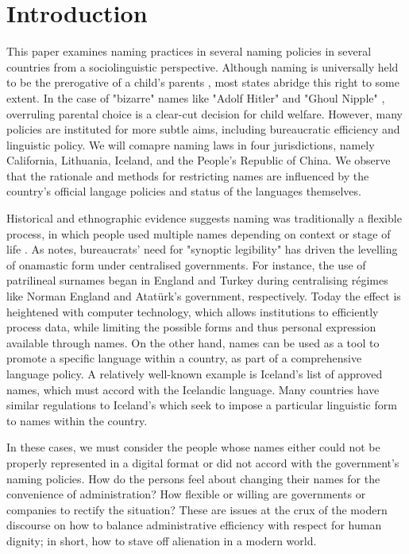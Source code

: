 \section{Introduction}

This paper examines naming practices in several naming policies in several
countries from a sociolinguistic perspective. Although naming is universally
held to be the prerogative of a child's parents \parencite{alford88}, most
states abridge this right to some extent. In the case of "bizarre" names like
"Adolf Hitler" and "Ghoul Nipple" \parencite{larson09}, overruling parental
choice is a clear-cut decision for child welfare. However, many policies are
instituted for more subtle aims, including bureaucratic efficiency and
linguistic policy. We will comapre naming laws in four jurisdictions, namely
California, Lithuania, Iceland, and the People's Republic of China. We observe
that the rationale and methods for restricting names are influenced by the
country's official langage policies and status of the languages themselves.

Historical and ethnographic evidence suggests naming was traditionally a
flexible process, in which people used multiple names depending on context or
stage of life \parencite{alford88} \parencite{scott02}. As \textcite{scott02}
notes, bureaucrats' need for "synoptic legibility" has driven the levelling of
onamastic form under centralised governments. For instance, the use of
patrilineal surnames began in England and Turkey during centralising régimes
like Norman England and Atatürk's government, respectively. Today the effect is
heightened with computer technology, which allows institutions to efficiently
process data, while limiting the possible forms and thus personal expression
available through names. On the other hand, names can be used as a tool to
promote a specific language within a country, as part of a comprehensive
language policy. A relatively well-known example is Iceland's list of approved
names, which must accord with the Icelandic language. Many countries have
similar regulations to Iceland's which seek to impose a particular linguistic
form to names within the country.

In these cases, we must consider the people whose names either could not be
properly represented in a digital format or did not accord with the government's
naming policies. How do the persons feel about changing their names for the
convenience of administration? How flexible or willing are governments or
companies to rectify the situation? These are issues at the crux of the modern
discourse on how to balance administrative efficiency with respect for human
dignity; in short, how to stave off alienation in a modern world.


